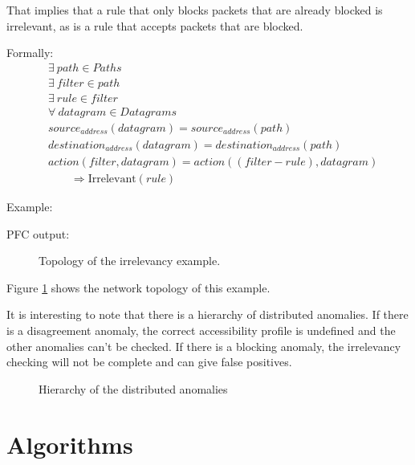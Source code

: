 That implies that a rule that only blocks packets that are already blocked is
irrelevant, as is a rule that accepts packets that are blocked.

Formally:
\begin{align*}
	& \exists ~ path \in Paths \\
	& \exists ~ filter \in path \\
	& \exists ~ rule \in filter \\
	& \forall ~ datagram \in Datagrams \\
	& source_{address}(datagram) = source_{address}(path) \\
	& destination_{address}(datagram) = destination_{address}(path) \\
	& action(filter, datagram) = action((filter - rule), datagram) \\
	& \qquad \Rightarrow \mbox{Irrelevant}(rule)
\end{align*}



Example:



PFC output:



\begin{figure}
	\caption{\label{fig:exirrelevancy:topo}Topology of the irrelevancy example.}
\end{figure}

Figure \ref{fig:exirrelevancy:topo} shows the network topology of this example.




It is interesting to note that there is a hierarchy of distributed anomalies. If
there is a disagreement anomaly, the correct accessibility profile is undefined
and the other anomalies can't be checked. If there is a blocking anomaly, the
irrelevancy checking will not be complete and can give false positives.

\begin{figure}
	\caption{\label{fig:distributedAnomalyHierarchy}Hierarchy of the distributed
	anomalies}
\end{figure}




\section{Algorithms}

